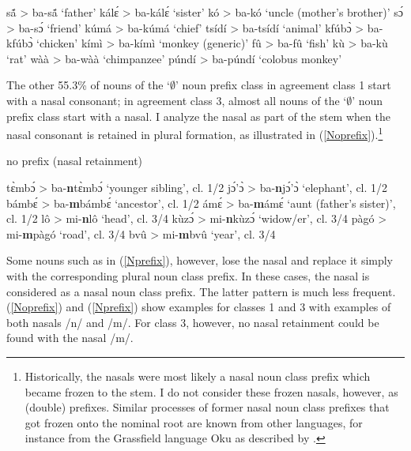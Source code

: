 \begin{exe} 
\ex\label{no-C} %
\begin{xlist}
\ex sã́ >  ba-sã́ `father'
\ex kálɛ́ >  ba-kálɛ́ `sister'
\ex kó >  ba-kó `uncle (mother's brother)'
\ex sɔ́ >  ba-sɔ́ `friend'
\ex kúmá >  ba-kúmá `chief'
\ex tsídí >  ba-tsídí `animal'
\ex kfúbɔ̀ >  ba-kfúbɔ̀ `chicken'
\ex kímì >  ba-kímì `monkey (generic)'
\ex fû >  ba-fû `fish'
\ex kù >  ba-kù `rat'
\ex wàà >  ba-wàà `chimpanzee'
\ex púndí >  ba-púndí `colobus monkey'
\end{xlist}
\end{exe}

The other 55.3\% of nouns of the `$\emptyset$' noun prefix class in agreement class 1 start with a nasal consonant; in agreement class 3, almost all nouns of the `$\emptyset$' noun prefix class start with a nasal. I analyze the nasal as part of the stem when the nasal consonant is retained in plural formation, as illustrated in (\ref{Noprefix}).\footnote{ Historically, the nasals were most likely a nasal noun class prefix which became frozen to the stem. I do not consider these frozen nasals, however, as (double) prefixes. Similar processes of former nasal noun class prefixes that got frozen onto the nominal root are known from other languages, for instance from the Grassfield language Oku as described by \citet[3]{blood99}.} 


\begin{exe} 
\ex\label{Noprefix} no prefix (nasal retainment)
\begin{xlist}
tɛ̀mbɔ́ > ba-{\bfseries n}tɛ̀mbɔ́ `younger sibling', cl. 1/2
jɔ́'ɔ̀ > ba-{\bfseries n}jɔ́'ɔ̀ `elephant', cl. 1/2
bámbɛ́  >  ba-{\bfseries m}bámbɛ́  `ancestor', cl. 1/2
ámɛ́ > ba-{\bfseries m}ámɛ́ `aunt (father's sister)', cl. 1/2
lô >  mi-{\bfseries n}lô `head', cl. 3/4
kùzɔ́ >  mi-{\bfseries n}kùzɔ́ `widow/er', cl. 3/4
pàgó >  mi-{\bfseries m}pàgó `road', cl. 3/4
bvû >  mi-{\bfseries m}bvû `year', cl. 3/4
\end{xlist}
\end{exe}

Some nouns such as in (\ref{Nprefix}), however, lose the nasal and replace it simply with the corresponding plural noun class prefix. In these cases, the nasal is considered as a nasal noun class prefix. The latter pattern is much less frequent. (\ref{Noprefix}) and (\ref{Nprefix}) show examples for classes 1 and 3 with examples of both nasals /n/ and /m/. For class 3, however, no nasal retainment could be found with the nasal /m/.

